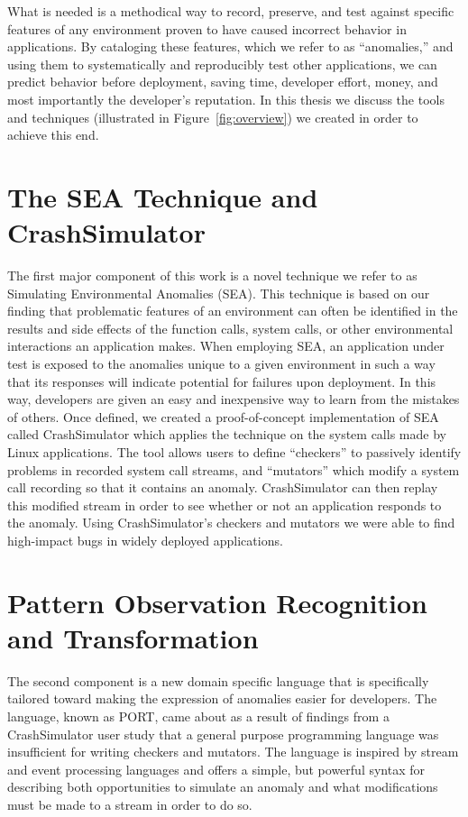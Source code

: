 What is needed is a methodical way to record, preserve, and test against
specific features of any environment proven to have caused incorrect
behavior in applications.
By cataloging these features,
which we refer to as ``anomalies,'' and using them to systematically and reproducibly test other applications, we can predict behavior before deployment, saving time, developer effort, money, and most importantly the developer's reputation. 
In this thesis we discuss the tools and techniques (illustrated in Figure~\ref{fig:overview}) we created in order to achieve this end.

\section{The SEA Technique and CrashSimulator}
The first major component of this work is a novel technique we refer to as Simulating Environmental Anomalies (SEA).
This technique is based on our finding that problematic features of an environment can often be identified in the results and side effects of the function calls, system calls, or other environmental interactions an application makes. When employing SEA,
an application under test is exposed
to the anomalies unique to a given environment
in such a way that its responses will indicate
potential for failures upon deployment. In this way, developers are given
an easy and inexpensive way to learn from the mistakes of others.
Once defined,
we created a proof-of-concept implementation of SEA called CrashSimulator which applies the technique on the system calls made by Linux applications.
The tool allows users to define ``checkers''
to passively identify problems in recorded system call streams,
and ``mutators'' which modify a system call recording so that it contains an anomaly.
CrashSimulator can then replay this modified stream in order to see whether or not
an application responds to the anomaly.
Using CrashSimulator's checkers and mutators we were able to find high-impact bugs in widely deployed applications.

\section{Pattern Observation Recognition and Transformation}
The second component is a new domain specific language that is specifically tailored toward making the expression of anomalies easier for developers.
The language,
known as PORT,
came about as a result of findings from a CrashSimulator user study that a general purpose programming language was insufficient for writing checkers and mutators. 
The language is inspired by stream and event processing languages and offers a simple,
but powerful syntax for describing both opportunities to simulate an anomaly and what modifications must be made to a stream in order to do so.

